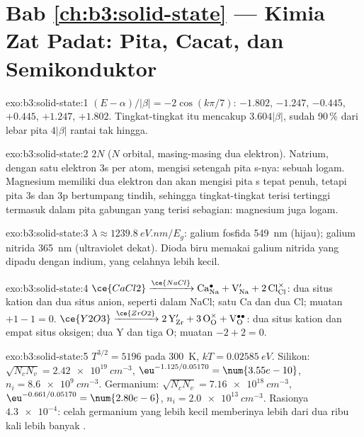\section*{Bab \ref{ch:b3:solid-state} --- Kimia Zat Padat: Pita, Cacat, dan Semikonduktor}

\begin{solution}{exo:b3:solid-state:1}
$(E - \alpha)/|\beta| = -2\cos(k\pi/7)$: $-1.802$, $-1.247$, $-0.445$, $+0.445$, $+1.247$, $+1.802$. Tingkat-tingkat itu mencakup
$3.604|\beta|$, sudah 90\,\% dari lebar pita $4|\beta|$ rantai tak hingga.
\end{solution}

\begin{solution}{exo:b3:solid-state:2}
$2N$ ($N$ orbital, masing-masing dua elektron). Natrium, dengan satu elektron 3s per atom, mengisi
setengah pita s-nya: sebuah logam. Magnesium memiliki dua elektron dan akan mengisi pita s tepat penuh,
tetapi pita 3s dan 3p bertumpang tindih, sehingga tingkat-tingkat terisi tertinggi termasuk dalam pita
gabungan yang terisi sebagian: magnesium juga logam.
\end{solution}

\begin{solution}{exo:b3:solid-state:3}
$\lambda \approx \qty{1239.8}{eV.nm}/E_g$: galium fosfida \qty{549}{nm} (hijau); galium nitrida \qty{365}{nm}
(ultraviolet dekat). Dioda biru memakai galium nitrida yang dipadu dengan indium, yang
celahnya lebih kecil.
\end{solution}

\begin{solution}{exo:b3:solid-state:4}
$\ce{CaCl2} \xrightarrow{\ce{NaCl}} \mathrm{Ca_{Na}^{\bullet} + V_{Na}' + 2\,Cl_{Cl}^{\times}}$: dua situs kation dan dua situs anion, seperti dalam NaCl; satu Ca dan
dua Cl; muatan $+1 - 1 = 0$. $\ce{Y2O3} \xrightarrow{\ce{ZrO2}} \mathrm{2\,Y_{Zr}' + 3\,O_O^{\times} + V_O^{\bullet\bullet}}$: dua situs kation dan empat situs oksigen; dua Y
dan tiga O; muatan $-2 + 2 = 0$.
\end{solution}

\begin{solution}{exo:b3:solid-state:5}
$T^{3/2} = 5196$ pada \qty{300}{K}, $kT = \qty{0.02585}{eV}$. Silikon: $\sqrt{N_cN_v} = \qty{2.42e19}{cm^{-3}}$, $\eu^{-1.125/0.05170} = \num{3.55e-10}$,
$n_i = \qty{8.6e9}{cm^{-3}}$. Germanium: $\sqrt{N_cN_v} = \qty{7.16e18}{cm^{-3}}$, $\eu^{-0.661/0.05170} = \num{2.80e-6}$, $n_i = \qty{2.0e13}{cm^{-3}}$. Rasionya
$\num{4.3e-4}$: celah germanium yang lebih kecil memberinya lebih dari dua ribu kali lebih banyak
.
\end{solution}

